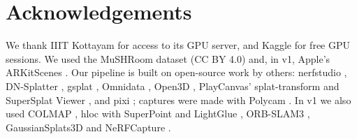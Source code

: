 \section*{Acknowledgements}
We thank IIIT Kottayam for access to its GPU server, and Kaggle for free GPU sessions. We used the MuSHRoom dataset \cite{ren2024mushroom} (CC BY 4.0) and, in v1, Apple's ARKitScenes \cite{baruch2021arkitscenes}. Our pipeline is built on open-source work by others: nerfstudio \cite{tancik2023nerfstudio}, DN-Splatter \cite{turkulainen2025dnsplatter, dnsplattercode}, gsplat \cite{ye2025gsplat}, Omnidata \cite{eftekhar2021omnidata}, Open3D \cite{zhou2018open3d}, PlayCanvas' splat-transform \cite{splattransform} and SuperSplat Viewer \cite{supersplatviewer}, and pixi \cite{pixi}; captures were made with Polycam \cite{polycam}. In v1 we also used COLMAP \cite{schoenberger2016colmap}, hloc \cite{sarlin2019hloc} with SuperPoint \cite{detone2018superpoint} and LightGlue \cite{lindenberger2023lightglue}, ORB-SLAM3 \cite{campos2021orbslam3}, GaussianSplats3D \cite{gaussiansplats3d} and NeRFCapture \cite{nerfcapture}.
